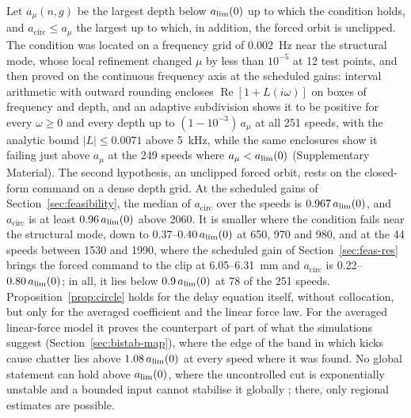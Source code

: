 Let $a_{\mu}(n,g)$ be the largest depth below $a_{\lim}(0)$ up to which the condition holds, and $a_{\mathrm{circ}}\le a_\mu$ the largest up to which, in addition, the forced orbit is unclipped. The condition was located on a frequency grid of \SI{0.002}{\hertz} near the structural mode, whose local refinement changed $\mu$ by less than $10^{-5}$ at 12 test points, and then proved on the continuous frequency axis at the scheduled gains: interval arithmetic with outward rounding encloses $\operatorname{Re}[1+L(i\omega)]$ on boxes of frequency and depth, and an adaptive subdivision shows it to be positive for every $\omega\ge0$ and every depth up to $(1-10^{-3})\,a_\mu$ at all 251 speeds, with the analytic bound $\lvert L\rvert\le0.0071$ above \SI{5}{\kilo\hertz}, while the same enclosures show it failing just above $a_\mu$ at the 249 speeds where $a_\mu<a_{\lim}(0)$ (Supplementary Material). The second hypothesis, an unclipped forced orbit, rests on the closed-form command on a dense depth grid. At the scheduled gains of Section~\ref{sec:feasibility}, the median of $a_{\mathrm{circ}}$ over the speeds is $0.967\,a_{\lim}(0)$, and $a_{\mathrm{circ}}$ is at least $0.96\,a_{\lim}(0)$ above \SI{2060}{\rpm}. It is smaller where the condition fails near the structural mode, down to 0.37--$0.40\,a_{\lim}(0)$ at 650, 970 and \SI{980}{\rpm}, and at the 44 speeds between 1530 and \SI{1990}{\rpm}, where the scheduled gain of Section~\ref{sec:feas-res} brings the forced command to the clip at 6.05--\SI{6.31}{\milli\metre} and $a_{\mathrm{circ}}$ is 0.22--$0.80\,a_{\lim}(0)$; in all, it lies below $0.9\,a_{\lim}(0)$ at 78 of the 251 speeds. Proposition~\ref{prop:circle} holds for the delay equation itself, without collocation, but only for the averaged coefficient and the linear force law. For the averaged linear-force model it proves the counterpart of part of what the simulations suggest (Section~\ref{sec:bistab-map}), where the edge of the band in which kicks cause chatter lies above $1.08\,a_{\lim}(0)$ at every speed where it was found. No global statement can hold above $a_{\lim}(0)$, where the uncontrolled cut is exponentially unstable and a bounded input cannot stabilise it globally \citep{hu2001book}; there, only regional estimates are possible.

